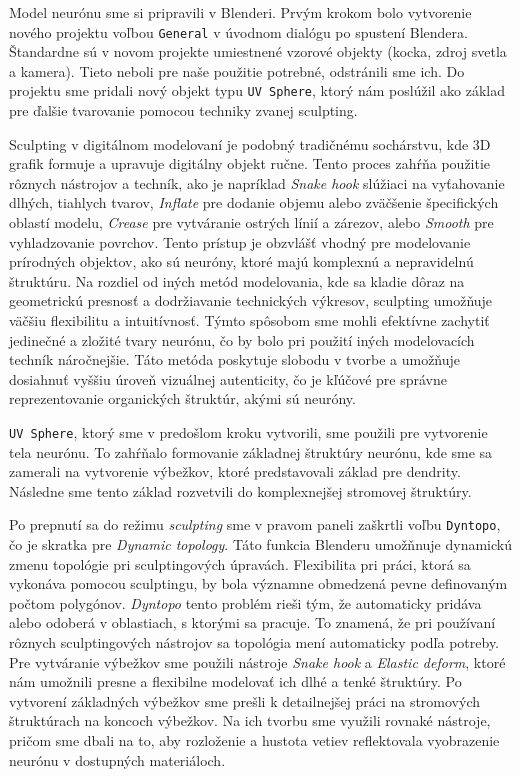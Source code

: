 Model neurónu sme si pripravili v Blenderi. Prvým krokom bolo vytvorenie nového projektu voľbou \texttt{General} v úvodnom dialógu po spustení Blendera. Štandardne sú v novom projekte 
umiestnené vzorové objekty (kocka, zdroj svetla a kamera). Tieto neboli pre naše použitie potrebné, odstránili sme ich. Do projektu sme pridali nový objekt typu \texttt{UV Sphere}, 
ktorý nám poslúžil ako základ pre ďalšie tvarovanie pomocou techniky zvanej sculpting. 

Sculpting v digitálnom modelovaní je podobný tradičnému sochárstvu, kde 3D grafik formuje a upravuje digitálny objekt ručne. Tento proces zahŕňa použitie
rôznych nástrojov a techník, ako je napríklad \emph{Snake hook} slúžiaci na vyťahovanie dlhých, tiahlych tvarov, \emph{Inflate} pre dodanie objemu alebo zväčšenie špecifických oblastí modelu,
\emph{Crease} pre vytváranie ostrých línií a zárezov, alebo \emph{Smooth} pre vyhladzovanie povrchov. Tento prístup je obzvlášť vhodný pre modelovanie prírodných objektov, ako sú neuróny, 
ktoré majú komplexnú a nepravidelnú štruktúru. Na rozdiel od iných metód modelovania, kde sa kladie dôraz na geometrickú presnosť a dodržiavanie technických výkresov, sculpting umožňuje 
väčšiu flexibilitu a intuitívnosť. Týmto spôsobom sme mohli efektívne zachytiť jedinečné a zložité tvary neurónu, čo by bolo pri použití iných modelovacích techník náročnejšie. 
Táto metóda poskytuje slobodu v tvorbe a umožňuje dosiahnuť vyššiu úroveň vizuálnej autenticity, čo je kľúčové pre správne reprezentovanie organických štruktúr, akými sú neuróny.

\texttt{UV Sphere}, ktorý sme v predošlom kroku vytvorili, sme použili pre vytvorenie tela neurónu. To zahŕňalo formovanie základnej štruktúry neurónu, kde sme sa zamerali na vytvorenie
výbežkov, ktoré predstavovali základ pre dendrity. Následne sme tento základ rozvetvili do komplexnejšej stromovej štruktúry.

Po prepnutí sa do režimu \emph{sculpting} sme v pravom paneli zaškrtli voľbu \texttt{Dyntopo}, čo je skratka pre \emph{Dynamic topology}. Táto funkcia Blenderu umožňnuje dynamickú zmenu
topológie pri sculptingových úpravách. Flexibilita pri práci, ktorá sa vykonáva pomocou sculptingu, by bola významne obmedzená pevne definovaným počtom polygónov. \emph{Dyntopo} tento problém
rieši tým, že automaticky pridáva alebo odoberá v oblastiach, s ktorými sa pracuje. To znamená, že pri používaní rôznych sculptingových nástrojov sa topológia mení automaticky podľa potreby.
Pre vytváranie výbežkov sme použili nástroje \emph{Snake hook} a \emph{Elastic deform}, ktoré nám umožnili presne a flexibilne modelovať ich dlhé a tenké štruktúry. Po vytvorení základných výbežkov
sme prešli k detailnejšej práci na stromových štruktúrach na koncoch výbežkov. Na ich tvorbu sme využili rovnaké nástroje, pričom sme dbali na to, aby rozloženie a hustota vetiev reflektovala
vyobrazenie neurónu v dostupných materiáloch. 

